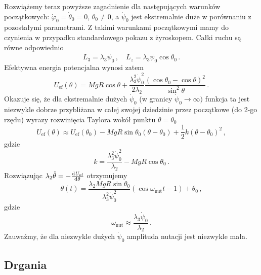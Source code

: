 \documentclass[../main.tex]{subfiles}
\begin{document}
\begin{itemize}
    Rozwiążemy teraz powyższe zagadnienie dla następujących warunków początkowych: \(\dot{\varphi}_0=\dot{\theta}_0=0\), \(\theta_0\neq0\), a \(\dot{\psi}_0\) jest ekstremalnie duże w porównaniu z pozostałymi parametrami. Z takimi warunkami początkowymi mamy do czynienia w przypadku standardowego pokazu z żyroskopem. Całki ruchu są równe odpowiednio
    \begin{equation*}
        L_3=\lambda_3\dot{\psi}_0\,,\quad L_z=\lambda_3\dot{\psi}_0\cos\theta_0\,.
    \end{equation*}
    Efektywna energia potencjalna wynosi zatem
    \begin{equation*}
        U_\text{ef}(\theta)=MgR\cos\theta+\frac{\lambda_3^2\dot{\psi}_0^2}{2\lambda_2}\frac{(\cos\theta_0-\cos\theta)^2}{\sin^2\theta}\,.
    \end{equation*}
    Okazuje się, że dla ekstremalnie dużych \(\dot{\psi}_0\) (w granicy \(\dot{\psi}_0\to\infty)\) funkcja ta jest niezwykle dobrze przybliżana w całej swojej dziedzinie przez początkowe (do 2-go rzędu) wyrazy rozwinięcia Taylora wokół punktu \(\theta=\theta_0\)
    \begin{equation*}
        U_\text{ef}(\theta)\approx U_\text{ef}(\theta_0)-MgR\sin\theta_0(\theta-\theta_0)+\frac{1}{2}k(\theta-\theta_0)^2\,,
    \end{equation*}
    gdzie 
    \begin{equation*}
        k=\frac{\lambda_3^2\dot{\psi}_0^2}{\lambda_2}-MgR\cos\theta_0\,.
    \end{equation*}
    Rozwiązując \(\lambda_2\ddot\theta=-\dv[]{U_\text{ef}}{\theta}\) otrzymujemy
    \begin{equation*}
        \theta(t)=\frac{\lambda_2MgR\sin\theta_0}{\lambda_3^2\dot{\psi}_0^2}(\cos\omega_\text{nut}t-1)+\theta_0\,,
    \end{equation*}
    gdzie
    \begin{equation*}
        \omega_\text{nut}\approx \frac{\lambda_3\dot{\psi}_0}{\lambda_2}\,.
    \end{equation*}
    Zauważmy, że dla niezwykle dużych \(\dot{\psi}_0\) amplituda nutacji jest niezwykle mała.
    \end{itemize}

    \subsection{Drgania}
\end{document}
